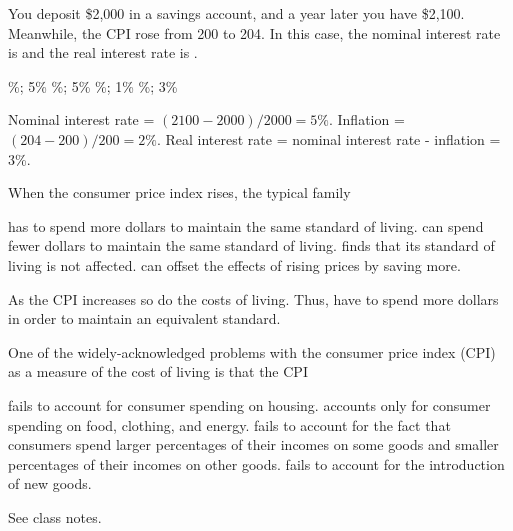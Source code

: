 \documentclass[addpoints,11pt]{exam}
\theoremstyle{definition}
\newcommand{\blank}[0]{\underline{\hspace{3cm}}}
\begin{document}
\begin{questions}
			
		\question You deposit \$2,000 in a savings account, and a year later you have \$2,100. Meanwhile, the CPI rose from 200 to 204. In this case, the nominal interest rate is \blank and the real interest rate is \blank.
		
			
			\begin{choices}
				\%; 5\% 
				\%; 5\%
				\%; 1\%
				\%; 3\%
			\end{choices}
			
			\begin{solution}
				Nominal interest rate = $(2100-2000)/2000 = 5\%.$ Inflation = $(204-200)/200 = 2\%$. Real interest rate = nominal interest rate - inflation = 3\%.
			\end{solution}
			
			\question When the consumer price index rises, the typical family
			
			\begin{choices}
				\CorrectChoice has to spend more dollars to maintain the same standard of living.
				\choice can spend fewer dollars to maintain the same standard of living.
				\choice finds that its standard of living is not affected.
				\choice can offset the effects of rising prices by saving more.
			\end{choices}
			
		\begin{solution}
			As the CPI increases so do the costs of living. Thus, have to spend more dollars in order to maintain an equivalent standard.
		\end{solution}
				
			\question One of the widely-acknowledged problems with the consumer price index (CPI) as a measure of the cost of living is that the CPI
					
					
					\begin{choices}
						\choice fails to account for consumer spending on housing.
						\choice accounts only for consumer spending on food, clothing, and energy.
						\choice fails to account for the fact that consumers spend larger percentages of their incomes on some goods and smaller percentages of their incomes on other goods.
						\CorrectChoice fails to account for the introduction of new goods.
					\end{choices}
					
					\begin{solution}
						See class notes.
					\end{solution}
				

\end{questions}
\end{document}
